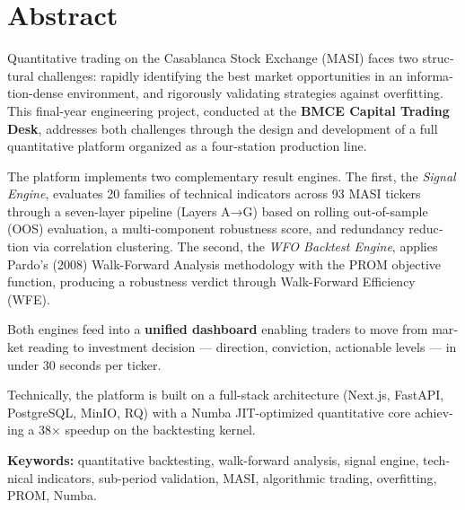 \chapter*{Abstract}
\thispagestyle{plain}

\begin{english}
Quantitative trading on the Casablanca Stock Exchange (MASI) faces two structural
challenges: rapidly identifying the best market opportunities in an information-dense
environment, and rigorously validating strategies against overfitting. This final-year
engineering project, conducted at the \textbf{BMCE Capital Trading Desk}, addresses
both challenges through the design and development of a full quantitative platform
organized as a four-station production line.

\medskip

The platform implements two complementary result engines. The first, the
\textit{Signal Engine}, evaluates 20 families of technical indicators across 93 MASI
tickers through a seven-layer pipeline (Layers A→G) based on rolling out-of-sample
(OOS) evaluation, a multi-component robustness score, and redundancy reduction via
correlation clustering. The second, the \textit{WFO Backtest Engine}, applies Pardo's
(2008) Walk-Forward Analysis methodology with the PROM objective function, producing
a robustness verdict through Walk-Forward Efficiency (WFE).

\medskip

Both engines feed into a \textbf{unified dashboard} enabling traders to move from
market reading to investment decision — direction, conviction, actionable levels —
in under 30 seconds per ticker.

\medskip

Technically, the platform is built on a full-stack architecture (Next.js, FastAPI,
PostgreSQL, MinIO, RQ) with a Numba JIT-optimized quantitative core achieving a 38×
speedup on the backtesting kernel.

\bigskip
\noindent\textbf{Keywords:}
quantitative backtesting, walk-forward analysis, signal engine, technical indicators,
sub-period validation, MASI, algorithmic trading, overfitting, PROM, Numba.
\end{english}
